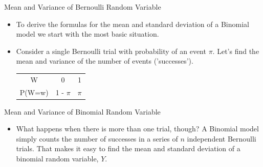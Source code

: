 \documentclass[10pt]{beamer}\usepackage[]{graphicx}\usepackage[]{color}
\begin{document}
\begin{frame}{Mean and Variance of Bernoulli Random Variable}
	\begin{itemize}
		\item To derive the formulas for the mean and standard deviation of a Binomial model we start with
		the most basic situation.
		\item Consider a single Bernoulli trial with probability of an event $\pi$. Let's find the mean and
		variance of the number of events ('successes').
		\begin{tabular}{c|c|c}
			\hline
			W & 0 & 1 \\
			P(W=w) & 1 - $\pi$ & $\pi$ \\
			\hline
		\end{tabular}
	\end{itemize}
\vspace*{1.5in}
	
\end{frame}


\begin{frame}{Mean and Variance of Binomial Random Variable}
	\begin{itemize}
	\item What happens when there is more than one trial, though? A Binomial model simply counts the
	number of successes in a series of $n$ independent Bernoulli trials. That makes it easy to find the
	mean and standard deviation of a binomial random variable, $Y$.
\end{itemize}
\vspace*{1.5in}
\end{frame}
\end{document}
